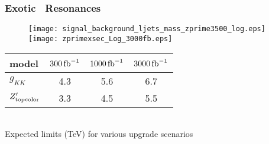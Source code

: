 \begin{frame}
    \frametitle{Exotic \ttbar\ Resonances}
\centering
\begin{figure}
\texttt{[image: signal\_background\_ljets\_mass\_zprime3500\_log.eps]}
\texttt{[image: zprimexsec\_Log\_3000fb.eps]}
\end{figure}

\begin{tabular}{lccc}
\hline
model              & $300\,{\rm fb}^{-1}$  & $1000\,{\rm fb}^{-1}$     & $3000\,{\rm fb}^{-1}$  \\
\hline
\hline
$g_{KK}$ & 4.3 & 5.6 & 6.7 \\
$Z^\prime_{\rm topcolor}$ & 3.3 & 4.5 & 5.5 \\
\hline
\end{tabular}
\vspace{5pt} \\
\noindent Expected limits (TeV) for various upgrade scenarios
\end{frame}
